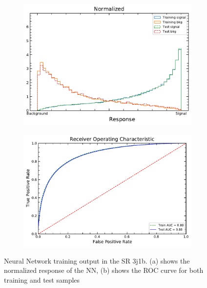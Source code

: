 
\begin{figure}[h!]
    \begin{subfigure}[b]{0.48\linewidth}
    \centering
    \includegraphics[width=0.95\linewidth]{ubonn-thesis/Chapters/Chapters_06/Figure/SR_3j1b/NormalizedResponse_PLV_3j1b_L27_20_10_06Oct2021.pdf} 
    \caption{} 
    \label{SR:3j1b:NNout} 
  \end{subfigure}%
  \vspace*{0.4cm}
  \begin{subfigure}[b]{0.48\linewidth}
    \centering
    \includegraphics[width=\linewidth]{ubonn-thesis/Chapters/Chapters_06/Figure/SR_3j1b/ROC_PLV_3j1b_L27_20_10_06Oct2021.pdf} 
    \caption{} 
    \label{SR:3j1b:ROC} 
  \end{subfigure}
  \vspace*{-0.5cm}
  \caption{Neural Network training output in the SR 3j1b. (a) shows the normalized response of the NN, (b) shows the ROC curve for both training and test samples}
  \label{SR:3j1b:NN(a)}
\end{figure}

